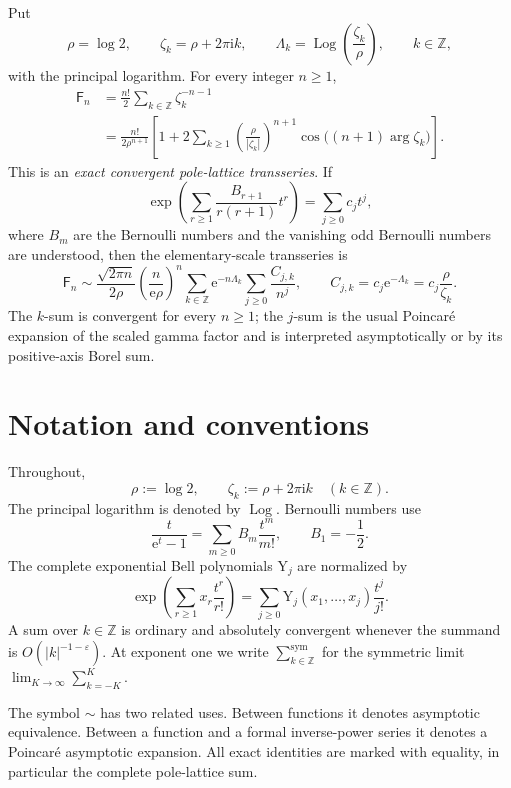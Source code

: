 \documentclass[11pt,a4paper,oneside]{article}
\theoremstyle{definition}
\theoremstyle{remark}
\newcommand{\Fub}{\mathsf{F}}
\newcommand{\Log}{\operatorname{Log}}
\newcommand{\e}{\mathrm{e}}
\newcommand{\ii}{\mathrm{i}}
\newcommand{\BellY}{\mathrm{Y}}
\newcommand{\asympseries}{\mathrel{\sim}}
\begin{document}
\begin{masterbox}
Put
\[
 \rho=\log 2,\qquad
 \zeta_k=\rho+2\pi\ii k,\qquad
 \Lambda_k=\Log\!\left(\frac{\zeta_k}{\rho}\right),
 \qquad k\in\mathbb Z,
\]
with the principal logarithm.  For every integer $n\ge1$,
\begin{align*}
 \Fub_n
 &=\frac{n!}{2}\sum_{k\in\mathbb Z}\zeta_k^{-n-1}\\
 &=\frac{n!}{2\rho^{n+1}}
   \left[1+2\sum_{k\ge1}
   \left(\frac{\rho}{|\zeta_k|}\right)^{n+1}
   \cos\!\bigl((n+1)\arg\zeta_k\bigr)\right].
\end{align*}
This is an \emph{exact convergent pole-lattice transseries}.  If
\[
 \exp\!\left(\sum_{r\ge1}
   \frac{B_{r+1}}{r(r+1)}t^r\right)
   =\sum_{j\ge0}c_jt^j,
\]
where $B_m$ are the Bernoulli numbers and the vanishing odd Bernoulli numbers
are understood, then the elementary-scale transseries is
\[
 \Fub_n\asympseries
 \frac{\sqrt{2\pi n}}{2\rho}
 \left(\frac{n}{\e\rho}\right)^n
 \sum_{k\in\mathbb Z}\e^{-n\Lambda_k}
 \sum_{j\ge0}\frac{C_{j,k}}{n^j},
 \qquad
 C_{j,k}=c_j\e^{-\Lambda_k}=c_j\frac{\rho}{\zeta_k}.
\]
The $k$-sum is convergent for every $n\ge1$; the $j$-sum is the usual
Poincar\'e expansion of the scaled gamma factor and is interpreted
asymptotically or by its positive-axis Borel sum.
\end{masterbox}

\tableofcontents

\section*{Notation and conventions}
Throughout,
\[
 \rho:=\log 2,
 \qquad \zeta_k:=\rho+2\pi\ii k\quad(k\in\mathbb Z).
\]
The principal logarithm is denoted by $\Log$.  Bernoulli numbers use
\[
 \frac{t}{\e^t-1}=\sum_{m\ge0}B_m\frac{t^m}{m!},
 \qquad B_1=-\frac12.
\]
The complete exponential Bell polynomials $\BellY_j$ are normalized by
\[
 \exp\!\left(\sum_{r\ge1}x_r\frac{t^r}{r!}\right)
 =\sum_{j\ge0}\BellY_j(x_1,\ldots,x_j)\frac{t^j}{j!}.
\]
A sum over $k\in\mathbb Z$ is ordinary and absolutely convergent whenever the
summand is $O(|k|^{-1-\varepsilon})$.  At exponent one we write
$\sum_{k\in\mathbb Z}^{\mathrm{sym}}$ for the symmetric limit
$\lim_{K\to\infty}\sum_{k=-K}^{K}$.

The symbol $\sim$ has two related uses.  Between functions it denotes
asymptotic equivalence.  Between a function and a formal inverse-power series
it denotes a Poincar\'e asymptotic expansion.  All exact identities are marked
with equality, in particular the complete pole-lattice sum.
\end{document}
